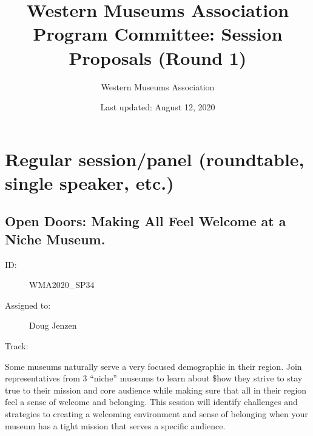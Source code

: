 \documentclass{report}
\title{ Western Museums Association Program Committee: Session Proposals (Round 1)}
\date{ Last updated: August 12, 2020}
\author{Western Museums Association}
\begin{document}
  \maketitle
  \newpage
  \tableofcontents
  \newpage
  
    \newpage
    \chapter*{ Regular session/panel (roundtable, single speaker, etc.) }

      
        
        
        
        
          \newpage
          \section{ Open Doors:  Making All Feel Welcome at a Niche Museum.  }
            \begin{description}
              \item [ID:]
              WMA2020\_SP34

              \item [Assigned to:]Doug Jenzen~
                \item [Track:]
              \end{description}

              Some museums naturally serve a very focused demographic in their region. Join representatives from 3 “niche” museums to learn about \$how they strive to stay true to their mission and core audience while making sure that all in their region feel a sense of welcome and belonging. This session will identify challenges and strategies to creating a welcoming environment and sense of belonging when your museum has a tight mission that serves a specific audience.
\end{document}
